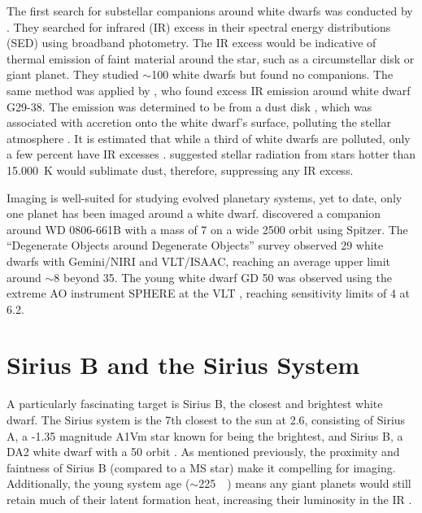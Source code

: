 \documentclass[twocolumn,linenumbers]{aastex631}
\begin{document}
The first search for substellar companions around white dwarfs was conducted by \citet{probstInfraredSearchVery1983}. They searched for infrared (IR) excess in their spectral energy distributions (SED) using broadband photometry. The IR excess would be indicative of thermal emission of faint material around the star, such as a circumstellar disk or giant planet. They studied $\sim$100 white dwarfs but found no companions. The same method was applied by \citet{zuckermanAncientPlanetarySystems2010}, who found excess IR emission around white dwarf G29-38. The emission was determined to be from a dust disk \citep{telescoObservationsG29381990}, which was associated with accretion onto the white dwarf's surface, polluting the stellar atmosphere \citep{koesterMetalsVariableG29381997}. It is estimated that while a third of white dwarfs are polluted, only a few percent have IR excesses \citep{bonsorInfraredObservationsWhite2017}. \citet{skemerSiriusImagedMidinfrared2011} suggested stellar radiation from stars hotter than \qty{15,000}{\kelvin} would sublimate dust, therefore, suppressing any IR excess.

Imaging is well-suited for studying evolved planetary systems, yet to date, only one planet has been imaged around a white dwarf. \citet{luhmanDiscoveryCandidateCoolest2011} discovered a companion around WD 0806-661B with a mass of \qty{7}{\jupitermass} on a wide \qty{2500}{\au} orbit using Spitzer. The ``Degenerate Objects around Degenerate Objects'' survey \citep[DODO;][]{hoganDODOSurveyII2009} observed 29 white dwarfs with Gemini/NIRI and VLT/ISAAC, reaching an average upper limit around $\sim$\qty{8}{\jupitermass} beyond \qty{35}{\au}. The young white dwarf GD 50 was observed using the extreme AO instrument SPHERE at the VLT \citep{xuExtremeAOSearchGiant2015a}, reaching sensitivity limits of \qty{4}{\jupitermass} at \qty{6.2}{\au}.

\section{Sirius B and the Sirius System} \label{sec:sirius}

A particularly fascinating target is Sirius B, the closest and brightest white dwarf. The Sirius system is the 7th closest to the sun at \qty{2.6}{\parsec}, consisting of Sirius A, a -1.35 magnitude A1Vm star known for being the brightest, and Sirius B, a DA2 white dwarf with a \qty{50}{\year} orbit \citep{collaborationGaiaMission2016, bondSiriusSystemIts2017,collaborationGaiaEarlyData2021a}. As mentioned previously, the proximity and faintness of Sirius B (compared to a MS star) make it compelling for imaging. Additionally, the young system age ($\sim$\qty{225}{\mega\year}) means any giant planets would still retain much of their latent formation heat, increasing their luminosity in the IR \citep{fortneyGiantPlanetInterior2010}.
\end{document}
